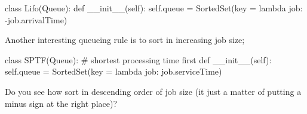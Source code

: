 \begin{exercise}
\begin{solution}
\begin{pyverbatim}
class Lifo(Queue):
    def __init__(self):
        self.queue = SortedSet(key = lambda job: -job.arrivalTime)
  
\end{pyverbatim}

Another interesting queueing rule is to sort in increasing job size;
\begin{pyverbatim}
  class SPTF(Queue): # shortest processing time first
    def __init__(self):
        self.queue = SortedSet(key = lambda job: job.serviceTime)
  
\end{pyverbatim}

Do you see how sort in descending order of job size (it just a matter
of putting a minus sign at the right place)?
  \end{solution}
\end{exercise}




